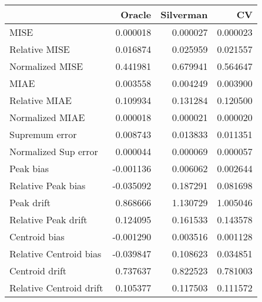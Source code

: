 \begin{tabular}{lrrr}
  \toprule
 & Oracle & Silverman & CV \\ 
  \midrule
MISE & 0.000018 & 0.000027 & 0.000023 \\ 
  Relative MISE & 0.016874 & 0.025959 & 0.021557 \\ 
  Normalized MISE & 0.441981 & 0.679941 & 0.564647 \\ 
  MIAE & 0.003558 & 0.004249 & 0.003900 \\ 
  Relative MIAE & 0.109934 & 0.131284 & 0.120500 \\ 
  Normalized MIAE & 0.000018 & 0.000021 & 0.000020 \\ 
  Supremum error & 0.008743 & 0.013833 & 0.011351 \\ 
  Normalized Sup error & 0.000044 & 0.000069 & 0.000057 \\ 
  Peak bias & -0.001136 & 0.006062 & 0.002644 \\ 
  Relative Peak bias & -0.035092 & 0.187291 & 0.081698 \\ 
  Peak drift & 0.868666 & 1.130729 & 1.005046 \\ 
  Relative Peak drift & 0.124095 & 0.161533 & 0.143578 \\ 
  Centroid bias & -0.001290 & 0.003516 & 0.001128 \\ 
  Relative Centroid bias & -0.039847 & 0.108623 & 0.034851 \\ 
  Centroid drift & 0.737637 & 0.822523 & 0.781003 \\ 
  Relative Centroid drift & 0.105377 & 0.117503 & 0.111572 \\ 
   \bottomrule
\end{tabular}
